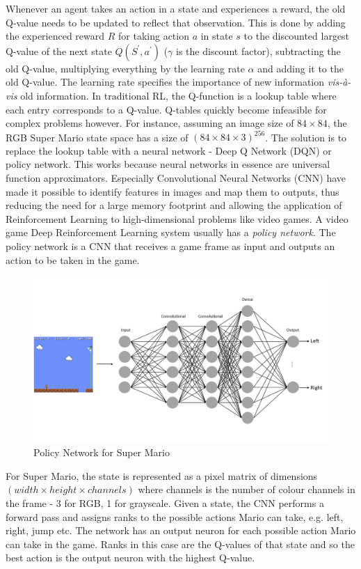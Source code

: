 \documentclass[notitlepage,a4paper,11pt]{article}
\begin{document}
Whenever an agent takes an action in a state and experiences a reward, the old Q-value needs to be updated to reflect that observation. This is done by adding the experienced reward $R$ for taking action $a$ in state $s$ to the discounted largest Q-value of the next state $Q(S^\prime, a^\prime)$ ($\gamma$ is the discount factor), subtracting the old Q-value, multiplying everything by the learning rate $\alpha$ and adding it to the old Q-value. The learning rate specifies the importance of new information \textit{vis-à-vis} old information. In traditional RL, the Q-function is a lookup table where each entry corresponds to a Q-value. Q-tables quickly become infeasible for complex problems however. For instance, assuming an image size of $84 \times 84$, the RGB Super Mario state space has a size of $(84 \times 84 \times 3)^{256}$. The solution is to replace the lookup table with a neural network - Deep Q Network (DQN) or policy network. This works because neural networks in essence are universal function approximators. Especially Convolutional Neural Networks (CNN) have made it possible to identify features in images and map them to outputs, thus reducing the need for a large memory footprint and allowing the application of Reinforcement Learning to high-dimensional problems like video games. A video game Deep Reinforcement Learning system usually has a \textit{policy network}. The policy network is a CNN that receives a game frame as input and outputs an action to be taken in the game. 

\begin{figure}[!htb]
\centering
\includegraphics[trim={0 2cm 0 2cm},clip,width=1\linewidth]{figs/deep_rl_video_game.png}
\caption{Policy Network for Super Mario} \label{fig:2}
\end{figure}

For Super Mario, the state is represented as a pixel matrix of dimensions $(width \times height \times channels)$ where channels is the number of colour channels in the frame - 3 for RGB, 1 for grayscale. Given a state, the CNN performs a forward pass and assigns ranks to the possible actions Mario can take, e.g. left, right, jump etc. The network has an output neuron for each possible action Mario can take in the game. Ranks in this case are the Q-values of that state and so the best action is the output neuron with the highest Q-value. 
\end{document}
